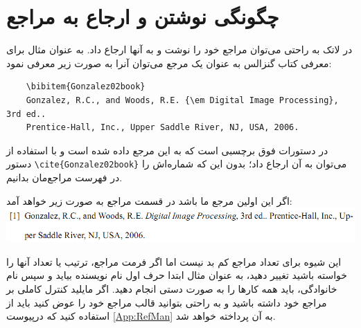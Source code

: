 %
\section{چگونگی نوشتن و ارجاع به مراجع}\label{Sec:Ref}

در لاتک به راحتی می‌توان مراجع خود را نوشت و به آنها ارجاع داد. به عنوان مثال برای معرفی کتاب گنزالس \cite{Gonzalez02book} به عنوان یک مرجع می‌توان آنرا به صورت زیر معرفی نمود:

\singlespacing
\begin{LTR}
	\begin{verbatim}
	\bibitem{Gonzalez02book}
	Gonzalez, R.C., and Woods, R.E. {\em Digital Image Processing}, 3rd ed..
	Prentice-Hall, Inc., Upper Saddle River, NJ, USA, 2006.
	\end{verbatim}
\end{LTR}
\doublespacing

در دستورات فوق   برچسبی است که به این مرجع داده شده است و با استفاده از دستور 
\verb!\cite{Gonzalez02book}!
می‌توان به آن ارجاع داد؛ بدون این که شماره‌اش را در فهرست مراجع‌مان بدانیم.

اگر این اولین مرجع ما باشد در قسمت مراجع به صورت زیر خواهد آمد:\\
\includegraphics[width=\textwidth]{Figures/Ch2/gonzalez.png}

این شیوه برای تعداد مراجع کم بد نیست اما اگر فرمت مراجع، ترتیب یا تعداد آنها را خواسته باشید تغییر دهید، به عنوان مثال ابتدا حرف اول نام نویسنده بیاید و سپس نام خانوادگی، باید همه کارها را به صورت دستی انجام دهید.
اگر مایلید کنترل کاملی بر مراجع خود داشته باشید و به راحتی بتوانید قالب مراجع خود را عوض کنید باید از  استفاده کنید که درپیوست  \ref{App:RefMan} به  آن پرداخته خواهد شد.
